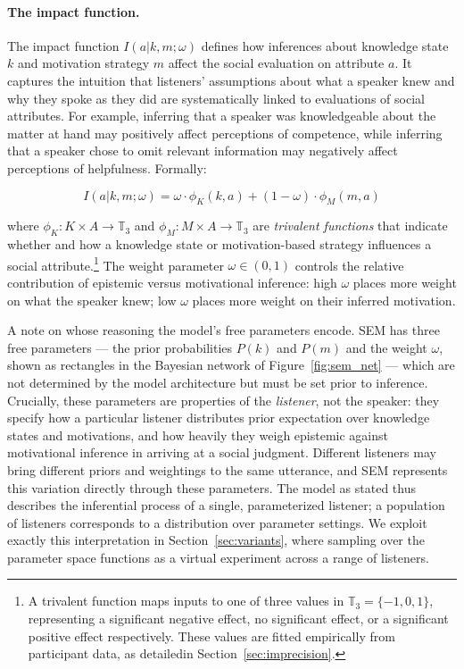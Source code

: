 \documentclass[12pt,a4paper]{article}
\begin{document}
\paragraph{The impact function.}
The impact function $I(a|k,m;\omega)$ defines how inferences about knowledge
state $k$ and motivation strategy $m$ affect the social evaluation on attribute
$a$. It captures the intuition that listeners' assumptions about what a speaker
knew and why they spoke as they did are systematically linked to evaluations of
social attributes. For example, inferring that a speaker 
was knowledgeable about the matter at hand 
may positively affect perceptions of competence, while inferring that a speaker
chose to omit relevant information may negatively affect perceptions of helpfulness.
Formally:

\begin{equation}
I(a|k,m;\omega) = \omega \cdot \phi_K(k,a) + (1-\omega) \cdot \phi_M(m,a)
\label{eq4}
\end{equation}

\noindent where $\phi_K: K \times A \rightarrow \mathbb{T}_3$ and
$\phi_M: M \times A \rightarrow \mathbb{T}_3$ are \emph{trivalent functions}
that indicate whether and how a knowledge state or motivation-based strategy
influences a social attribute.\footnote{A trivalent function maps inputs to one
of three values in $\mathbb{T}_3 = \{-1, 0, 1\}$, representing a significant
negative effect, no significant effect, or a significant positive effect
respectively. These values are fitted empirically from participant data, as
detailedin Section~\ref{sec:imprecision}.} The weight parameter $\omega \in
(0,1)$ controls the relative contribution of epistemic versus motivational
inference: high $\omega$ places more weight on what the speaker knew; low
$\omega$ places more weight on their inferred motivation.

A note on whose reasoning the model's free parameters encode. SEM has three
free parameters --- the prior probabilities $P(k)$ and $P(m)$ and the weight
$\omega$, shown as rectangles in the Bayesian network of
Figure~\ref{fig:sem_net} --- which are not determined by the model architecture
but must be set prior to inference.  Crucially, these parameters are properties of the \emph{listener}, not
the speaker: they specify how a particular listener distributes prior expectation
over knowledge states and motivations, and how heavily they weigh epistemic
against motivational inference in arriving at a social judgment. Different
listeners may bring different priors and weightings to the same utterance, and
SEM represents this variation directly through these parameters. The model as
stated thus describes the inferential process of a single, parameterized
listener; a population of listeners corresponds to a distribution over parameter
settings. We exploit exactly this interpretation in Section~\ref{sec:variants},
where sampling over the parameter space functions as a virtual experiment across
a range of listeners.
\end{document}
